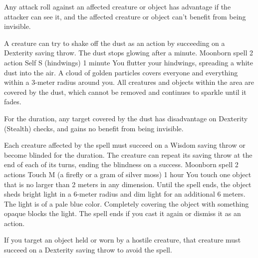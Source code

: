         Any attack roll against an affected creature or object has advantage if the attacker can see it, and the affected creature or object can't benefit from being invisible.

        A creature can try to shake off the dust as an action by succeeding on a Dexterity saving throw.
        The dust stops glowing after a minute.
        {Moonborn spell}
        {2 action}
        {Self}
        {S (hindwings)}
        {1 minute}
        You flutter your hindwings, spreading a white dust into the air.
        A cloud of golden particles covers everyone and everything within a 3-meter radius around you.
        All creatures and objects within the area are covered by the dust, which cannot be removed and continues to sparkle until it fades.

        For the duration, any target covered by the dust has disadvantage on Dexterity (Stealth) checks, and gains no benefit from being invisible.

        Each creature affected by the spell must succeed on a Wisdom saving throw or become blinded for the duration.
        The creature can repeat its saving throw at the end of each of its turns, ending the blindness on a success.
        {Moonborn spell}
        {2 actions}
        {Touch}
        {M (a firefly or a gram of silver moss)}
        {1 hour}
        You touch one object that is no larger than 2 meters in any dimension.
        Until the spell ends, the object sheds bright light in a 6-meter radius and dim light for an additional 6 meters.
        The light is of a pale blue color.
        Completely covering the object with something opaque blocks the light.
        The spell ends if you cast it again or dismiss it as an action.

        If you target an object held or worn by a hostile creature, that creature must succeed on a Dexterity saving throw to avoid the spell.

\newpage~\newpage
